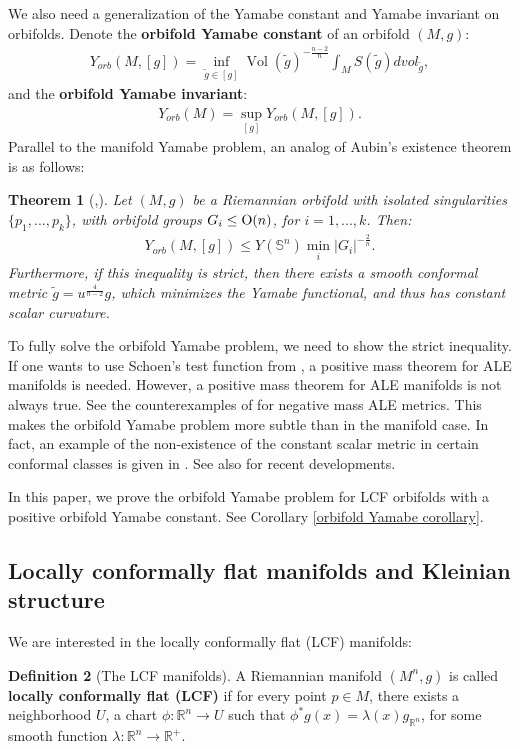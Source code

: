 \documentclass[12pt]{amsart}
\newtheorem{theorem}{Theorem}[section]
\theoremstyle{definition}
\newtheorem{definition}[theorem]{Definition}
\begin{document}
We also need a generalization of the Yamabe constant and Yamabe invariant on orbifolds. Denote the \textbf{orbifold Yamabe constant} of an orbifold $(M,g)$:
\begin{align*}
    Y_{orb}(M,[g]) = \inf_{\tilde{g}\in[g]}\operatorname{Vol}(\tilde{g})^{-\frac{n-2}{n}}\int_M S({\tilde{g}}) dvol_{\tilde{g}},
\end{align*}
and the \textbf{orbifold Yamabe invariant}:
\begin{align*}
    Y_{orb}(M) = \sup_{[g]} Y_{orb}(M,[g]).
\end{align*}
Parallel to the manifold Yamabe problem, an analog of Aubin's existence theorem is as follows:
\begin{theorem}[\cite{AB04},\cite{akutagawa2012computations}]\label{t:orbifold Yamabe existence}
Let $(M,g)$ be a Riemannian orbifold with isolated singularities $\{p_1, ...,p_k\}$, with orbifold groups $G_i \leq {\rm{O}}(n)$, for $i=1,...,k$. Then:
\begin{align*}
    Y_{orb}(M,[g])\leq Y(\mathbb{S}^n)\min_{i}|G_i|^{-\frac{2}{n}}.
\end{align*}
Furthermore, if this inequality is strict, then there exists a smooth conformal metric $\tilde{g} = u^{\frac{4}{n-2}}g$, which minimizes the Yamabe functional, and thus has constant scalar curvature.
\end{theorem}
To fully solve the orbifold Yamabe problem, we need to show the strict inequality. If one wants to use Schoen's test function from \cite{Sch84}, a positive mass theorem for ALE manifolds is needed. However, a positive mass theorem for ALE manifolds is not always true. See the counterexamples of \cite{Lebrun} for negative mass ALE metrics. This makes the orbifold Yamabe problem more subtle than in the manifold case. In fact, an example of the non-existence of the constant scalar metric in certain conformal classes is given in \cite{viaclovsky2010monopole}. See also \cite{ju2023conformally} for recent developments.

In this paper, we prove the orbifold Yamabe problem for LCF orbifolds with a positive orbifold Yamabe constant. See Corollary \ref{orbifold Yamabe corollary}.


\subsection{Locally conformally flat manifolds and Kleinian structure}\label{s:lcf and Kleinian}
We are interested in the locally conformally flat (LCF) manifolds:
\begin{definition}[The LCF manifolds]\label{def 1}
    A Riemannian manifold $(M^n,g)$ is called \textbf{locally conformally flat (LCF)} if for every point $p\in M$, there exists a neighborhood $U$, a chart $\phi:\mathbb{R}^n\to U$ such that $\phi^*g(x)=\lambda(x)g_{\mathbb{R}^n}$, for some smooth function $\lambda:\mathbb{R}^n\to\mathbb{R}^+$.

\end{definition}
\end{document}
